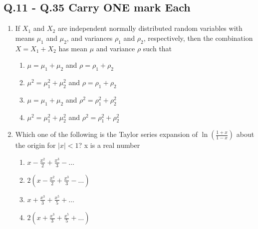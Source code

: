 \documentclass[journal]{IEEEtran}
\theoremstyle{remark}
\begin{document}
\subsection*{Q.11 - Q.35 Carry ONE mark Each}
\begin{enumerate}[resume]
\item If $X_1$ and $X_2$ are independent normally distributed random variables with means $\mu_1$ and $\mu_2$, and variances $\rho_1$ and $\rho_2$, respectively, then the combination $X = X_1 + X_2$ has mean $\mu$ and variance $\rho$ such that \hfill{}
\begin{enumerate}
\item $\mu = \mu_1 + \mu_2$ and $\rho = \rho_1 + \rho_2$
\item $\mu^2 = \mu_1^2 + \mu_2^2$ and $\rho = \rho_1 + \rho_2$
\item $\mu = \mu_1 + \mu_2$ and $\rho^2 = \rho_1^2 + \rho_2^2$
\item $\mu^2 = \mu_1^2 + \mu_2^2$ and $\rho^2 = \rho_1^2 + \rho_2^2$
\end{enumerate}

\item Which one of the following is the Taylor series expansion of $\ln(\frac{1+x}{1-x})$ about the origin for $|x|<1$? x is a real number \hfill{}
\begin{multicols}{2}
\begin{enumerate}
\item $x - \frac{x^2}{2} + \frac{x^3}{3} - \dots$
\item $2(x - \frac{x^2}{2} + \frac{x^3}{3} - \dots)$
\item $x + \frac{x^3}{3} + \frac{x^5}{5} + \dots$
\item $2(x + \frac{x^3}{3} + \frac{x^5}{5} + \dots)$
\end{enumerate}
\end{multicols}


\end{enumerate}
\end{document}

